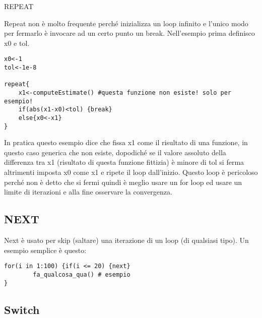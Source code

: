 REPEAT

Repeat non è molto frequente perché inizializza un loop infinito e l'unico modo per fermarlo è invocare ad un certo punto un break.
Nell'esempio prima definisco x0 e tol.

\begin{lstlisting}
x0<-1
tol<-1e-8

repeat{
	x1<-computeEstimate() #questa funzione non esiste! solo per esempio!
	if(abs(x1-x0)<tol) {break}
	else{x0<-x1}
}

\end{lstlisting}
In pratica questo esempio dice che fissa x1 come il risultato di una funzione, in questo caso generica che non esiste, dopodiché se il valore assoluto della differenza tra x1 (risultato di questa funzione fittizia) è minore di tol si ferma altrimenti imposta x0 come x1 e ripete il loop dall'inizio.
Questo loop è pericoloso perché non è detto che si fermi quindi è meglio usare un for
loop ed usare un limite di iterazioni e alla fine osservare la convergenza.

\subsection{NEXT}

Next è usato per skip (saltare) una iterazione di un loop (di qualsiasi tipo). Un esempio semplice è questo:

\begin{lstlisting}
for(i in 1:100) {if(i <= 20) {next}
		fa_qualcosa_qua() # esempio
}
\end{lstlisting}


\subsection{Switch}





